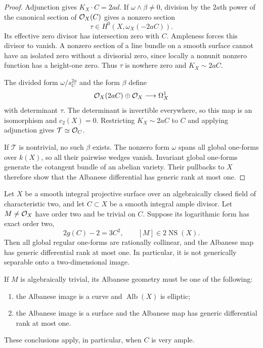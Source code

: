 \begin{proof}
Adjunction gives $K_X\cdot C=2ad$.  If
$\omega\wedge\beta\ne0$, division by the $2a$th power of the
canonical section of $\mathcal O_X(C)$ gives a nonzero section
\[
 \tau\in H^0(X,\omega_X(-2aC)).
\]
Its effective zero divisor has intersection zero with $C$.
Ampleness forces this divisor to vanish.  A nonzero section of a
line bundle on a smooth surface cannot have an isolated zero
without a divisorial zero, since locally a nonunit nonzero function
has a height-one zero.  Thus $\tau$ is nowhere zero and
$K_X\sim2aC$.

The divided form $\omega/s_C^{2a}$ and the form $\beta$ define
\[
 \mathcal O_X(2aC)\oplus\mathcal O_X\longrightarrow\Omega_X^1
\]
with determinant $\tau$.  The determinant is invertible everywhere,
so this map is an isomorphism and $c_2(X)=0$.  Restricting
$K_X\sim2aC$ to $C$ and applying adjunction gives
$\mathcal T\simeq\mathcal O_C$.

If $\mathcal T$ is nontrivial, no such $\beta$ exists.  The nonzero
form $\omega$ spans all global one-forms over $k(X)$, so all their
pairwise wedges vanish.  Invariant global one-forms generate the
cotangent bundle of an abelian variety.  Their pullbacks to $X$
therefore show that the Albanese differential has generic rank at
most one.
\end{proof}

\begin{corollary}
\label{cor:boundary-smallest-albanese-gate}
Let $X$ be a smooth integral projective surface over an algebraically
closed field of characteristic two, and let $C\subset X$ be a smooth
integral ample divisor.  Let $M\ne\mathcal O_X$ have order two and be
trivial on $C$.  Suppose its logarithmic form has exact order two,
\[
 2g(C)-2=3C^2,
 \qquad [M]\in2\operatorname{NS}(X).
\]
Then all global regular one-forms are rationally collinear, and the
Albanese map has generic differential rank at most one.  In particular,
it is not generically separable onto a two-dimensional image.

If $M$ is algebraically trivial, its Albanese geometry must be one
of the following:
\begin{enumerate}
 \item the Albanese image is a curve and $\operatorname{Alb}(X)$
       is elliptic;
 \item the Albanese image is a surface and the Albanese map has
       generic differential rank at most one.
\end{enumerate}
These conclusions apply, in particular, when $C$ is very ample.
\end{corollary}

